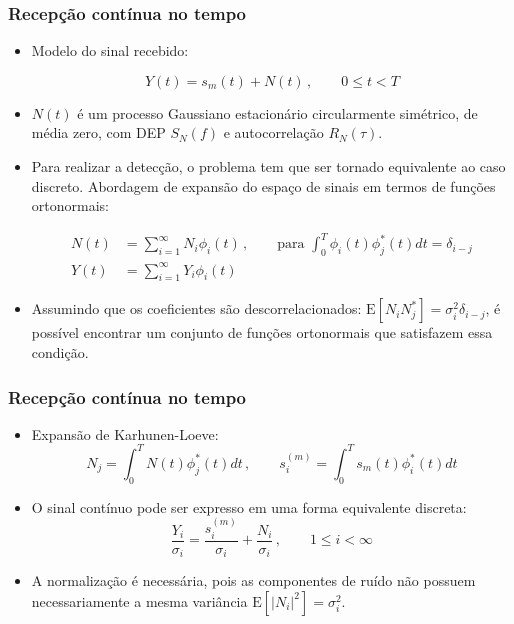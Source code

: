 \begin{frame}
	\frametitle{Recepção contínua no tempo}

	\begin{itemize}
	    \item Modelo do sinal recebido:
	    \begin{small}
	    \begin{equation*}
		Y(t) = s_m(t) + N(t) \, , \qquad 0 \leq t < T
	    \end{equation*}
	    \end{small}
	    \item $N(t)$ é um processo Gaussiano estacionário circularmente simétrico, de média zero, com DEP $S_N(f)$ e autocorrelação $R_N(\tau)$.
	    \item Para realizar a detecção, o problema tem que ser tornado equivalente ao caso discreto. Abordagem de expansão do espaço de sinais em termos de funções ortonormais:
	    \begin{small}
	    \begin{align*}
		N(t) &= \sum_{i=1}^{\infty} N_i \phi_i(t) \, , \qquad \text{para } \int_0^T \phi_i(t)\phi_j^*(t)dt = \delta_{i-j} \\
		Y(t) &= \sum_{i=1}^{\infty} Y_i \phi_i(t)
	    \end{align*}
	    \end{small}
	    \item Assumindo que os coeficientes são descorrelacionados: $\mathrm{E}[N_iN_j^*] = \sigma_i^2 \delta_{i-j}$, é possível encontrar um conjunto de funções ortonormais que satisfazem essa condição.
	\end{itemize}			
\end{frame}

\begin{frame}
	\frametitle{Recepção contínua no tempo}

	\begin{itemize}
	    \item Expansão de Karhunen-Loeve:
	    \begin{equation*}
		N_j = \int_0^T N(t) \phi_j^*(t) dt  \, , \qquad s_i^{(m)} = \int_0^T s_m(t) \phi_i^*(t) dt
	    \end{equation*}
	    \item O sinal contínuo pode ser expresso em uma forma equivalente discreta:
	    \begin{equation*}
		\frac{Y_i}{\sigma_i} = \frac{s_i^{(m)}}{\sigma_i} + \frac{N_i}{\sigma_i} \, , \qquad 1 \leq i < \infty
	    \end{equation*}
	    \item A normalização é necessária, pois as componentes de ruído não possuem necessariamente a mesma variância $\mathrm{E}[|N_i|^2] = \sigma_i^2$.
	\end{itemize}			
\end{frame}


